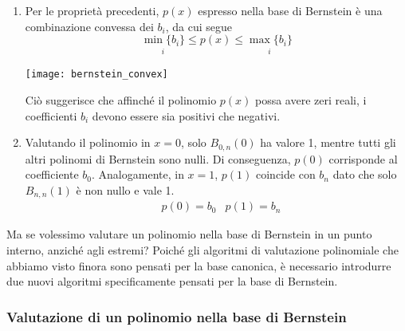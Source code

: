 \documentclass{article}
\begin{document}
\begin{enumerate}
    \item Per le proprietà precedenti, $p(x)$ espresso nella base di Bernstein
        è una combinazione convessa dei $b_i$, da cui segue
        $$\underset{i}{\min\{b_i\}}\leq p(x)\leq \underset{i}{\max\{b_i\}}$$
        \begin{center}
            \texttt{[image: bernstein\_convex]}
        \end{center}
        Ciò suggerisce che affinché il polinomio $p(x)$ possa avere zeri
        reali, i coefficienti $b_i$ devono essere sia positivi che negativi.
    \item Valutando il polinomio in $x=0$, solo $B_{0,n}(0)$ ha valore 1,
        mentre tutti gli altri polinomi di Bernstein sono nulli. Di
        conseguenza, $p(0)$ corrisponde al coefficiente $b_0$. Analogamente,
        in $x=1$, $p(1)$ coincide con $b_n$ dato che solo $B_{n,n}(1)$ è non
        nullo e vale 1.
        \begin{equation*}
            \begin{aligned}
               & p(0)=b_0 & p(1)=b_n 
            \end{aligned}
        \end{equation*}
\end{enumerate}
Ma se volessimo valutare un polinomio nella base di Bernstein in un punto interno, 
anziché agli estremi? Poiché gli algoritmi di valutazione polinomiale che
abbiamo visto finora sono pensati per la base canonica, è necessario
introdurre due nuovi algoritmi specificamente pensati per la base di
Bernstein.
\subsubsection{Valutazione di un polinomio nella base di Bernstein}
\end{document}
